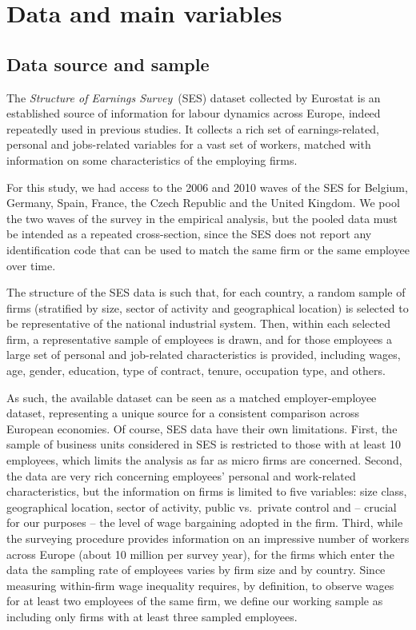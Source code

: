 \documentclass[12pt]{article}
\begin{document}
\section{Data and main variables}
\label{sec:data}

\subsection{Data source and sample}

The \emph{Structure of Earnings Survey}~(SES) dataset collected by Eurostat is an established source of information for labour dynamics across Europe, indeed repeatedly used in previous studies. It collects a rich set of earnings-related, personal and jobs-related variables for a vast set of workers, matched with information on some characteristics of the employing firms.

For this study, we had access to the 2006 and 2010 waves of the SES for Belgium, Germany, Spain, France, the Czech Republic and the United Kingdom. We pool the two waves of the survey in the empirical analysis, but the pooled data must be intended as a repeated cross-section, since the SES does not report any identification code that can be used to match the same firm or the same employee over time.

The structure of the SES data is such that, for each country, a random sample of firms (stratified by size, sector of activity and geographical location) is selected to be representative of the national industrial system. Then, within each selected firm, a representative sample of employees is drawn, and for those employees a large set of personal and job-related characteristics is provided, including wages, age, gender, education, type of contract, tenure, occupation type, and others. 

As such, the available dataset can be seen as a matched employer-employee dataset, representing a unique source for a consistent comparison across European economies.  Of course, SES data have their own limitations. First, the sample of business units considered in SES is restricted to those with at least 10 employees, which limits the analysis as far as micro firms are concerned. Second, the data are very rich concerning employees' personal and work-related characteristics, but the information on firms is limited to five variables: size class, geographical location, sector of activity, public vs.\ private control and -- crucial for our purposes -- the level of wage bargaining adopted in the firm. Third, while the surveying procedure provides information on an impressive number of workers across Europe (about 10 million per survey year), for the firms which enter the data the sampling rate of employees varies by firm size and by country. Since measuring within-firm wage inequality requires, by definition, to observe wages for at least two employees of the same firm, we define our working sample as including only firms with at least three sampled employees.
\end{document}
